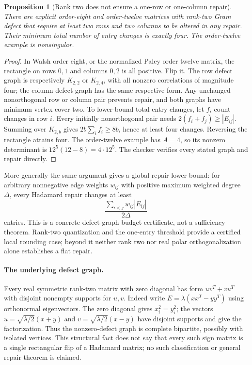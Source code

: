 \documentclass[11pt]{article}
\newtheorem{proposition}[theorem]{Proposition}
\begin{document}
\begin{proposition}[Rank two does not ensure a one-row or one-column repair]
\label{prop:spectral-nontrivial-repair}
There are explicit order-eight and order-twelve matrices with rank-two
Gram defect that require at least two rows and two columns to be altered
in any repair. Their minimum total number of entry changes is exactly
four. The order-twelve example is nonsingular.
\end{proposition}
\begin{proof}
In Walsh order eight, or the normalized Paley order twelve matrix, the
rectangle on rows $0,1$ and columns $0,2$ is all positive. Flip it.
The row defect graph is respectively $K_{2,2}$ or $K_{2,4}$, with all
nonzero correlations of magnitude four; the column defect graph has
the same respective form. Any unchanged nonorthogonal row or column
pair prevents repair, and both graphs have minimum vertex cover two.
To lower-bound total entry changes, let $f_i$ count changes in row $i$.
Every initially nonorthogonal pair needs
$2(f_i+f_j)\ge|E_{ij}|$. Summing over $K_{2,b}$ gives
$2b\sum_i f_i\ge 8b$, hence at least four changes. Reversing the
rectangle attains four. The order-twelve example has $A=4$, so its
nonzero determinant is $12^5(12-8)=4\cdot12^5$.
The checker verifies every stated graph and repair directly.
\end{proof}

More generally the same argument gives a global repair lower bound:
for arbitrary nonnegative edge weights $w_{ij}$ with positive maximum
weighted degree $\Delta$, every Hadamard repair changes at least
\[
 \frac{\sum_{i<j}w_{ij}|E_{ij}|}{2\Delta}
\]
entries. This is a concrete defect-graph budget certificate, not a
sufficiency theorem. Rank-two quantization and the one-entry threshold
provide a certified local rounding case; beyond it neither rank two nor
real polar orthogonalization alone establishes a flat repair.

\paragraph{The underlying defect graph.}
Every real symmetric rank-two matrix with zero diagonal has form
$uv^T+vu^T$ with disjoint nonempty supports for $u,v$. Indeed write
$E=\lambda(xx^T-yy^T)$ using orthonormal eigenvectors. The zero diagonal
gives $x_i^2=y_i^2$; the vectors
$u=\sqrt{\lambda/2}(x+y)$ and
$v=\sqrt{\lambda/2}(x-y)$ have disjoint supports and give the factorization.
Thus the nonzero-defect graph is complete bipartite, possibly with isolated
vertices. This structural fact does not say that every such sign matrix
is a single rectangular flip of a Hadamard matrix; no such classification
or general repair theorem is claimed.
\end{document}
